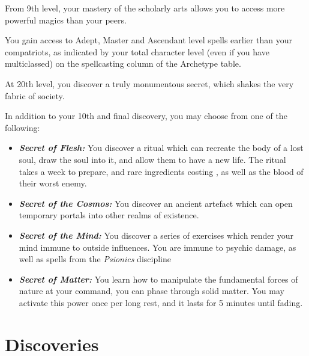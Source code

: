 {
From 9th level, your mastery of the scholarly arts allows you to access more powerful magics than your peers. 

You gain access to Adept, Master and Ascendant level spells earlier than your compatriots, as indicated by your total character level (even if you have multiclassed) on the spellcasting column of the Archetype table. 
}

{
	At 20th level, you discover a truly monumentous secret, which shakes the very fabric of society. 
	
	In addition to your 10th and final discovery, you may choose from one of the following:
	
	\newcommand\secret[2]
	{
		\item \textbf{\textit{#1:}} #2
	}
	
	\begin{itemize}
		\secret{Secret of Flesh}{You discover a ritual which can recreate the body of a lost soul, draw the soul into it, and allow them to have a new life. The ritual takes a week to prepare, and rare ingredients costing \galleon{300}, as well as the blood of their worst enemy.}
		\secret{Secret of the Cosmos}{You discover an ancient artefact which can open temporary portals into other realms of existence.}
		\secret{Secret of the Mind}{You discover a series of exercises which render your mind immune to outside influences. You are immune to psychic damage, as well as spells from the {\it Psionics} discipline}
		\secret{Secret of Matter}{You learn how to manipulate the fundamental forces of nature at your command, you can phase through solid matter. You may activate this power once per long rest, and it lasts for 5 minutes until fading.}
	\end{itemize}

}



\section*{Discoveries}

\newcommand\discovery[5]{
\subsubsection{\textit{\textbf{#1}}}
{\setlength\parskip{5 pt}
\if#21
	{\it Prerequisite: #3}
\fi

#4

#5
}
}


